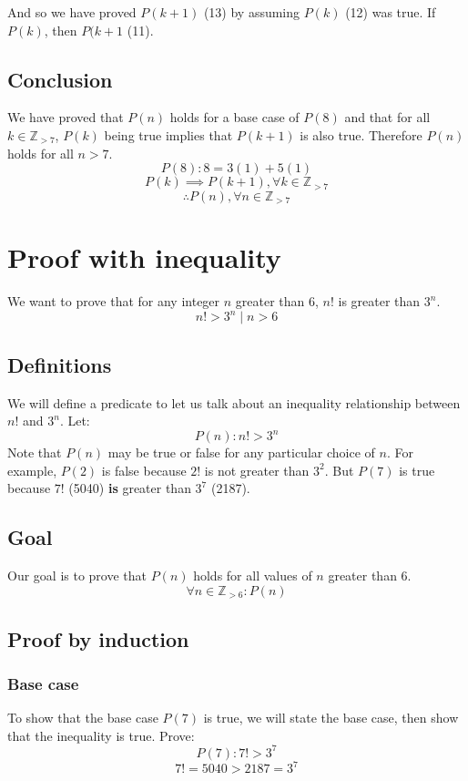 \documentclass{article}
\begin{document}
And so we have proved $P(k + 1)$ (13) by assuming $P(k)$ (12) was true. If $P(k)$, then $P(k + 1$ (11).

\subsection{Conclusion}
We have proved that $P(n)$ holds for a base case of $P(8)$ and that for all $k \in \mathbb Z_{> 7}$, $P(k)$ being true implies that $P(k + 1)$ is also true. Therefore $P(n)$ holds for all $n > 7$.
\[P(8): 8 = 3(1) + 5(1) \]
\[P(k) \implies P(k + 1), \forall k \in  \mathbb Z_{> 7}\]
\[ \therefore P(n), \forall n \in \mathbb Z_{> 7} \]


\section{Proof with inequality}
We want to prove that for any integer $n$ greater than 6, $n!$ is greater than $3^n$.
\[n! > 3^n \mid n > 6 \]
\subsection{Definitions}
We will define a predicate to let us talk about an inequality relationship between $n!$ and $3^n$. Let:
\begin{equation}
P(n): n! > 3^n
\end{equation}
Note that $P(n)$ may be true or false for any particular choice of $n$. For example, $P(2)$ is false because $2!$ is not greater than $3^2$. But $P(7)$ is true because $7!$ (5040) \textbf{is} greater than $3^7$ (2187).

\subsection{Goal}
Our goal is to prove that $P(n)$ holds for all values of $n$ greater than 6.
\begin{equation}
\forall n \in \mathbb Z_{> 6} : P(n)
\end{equation}

\subsection{Proof by induction}
\subsubsection{Base case}
To show that the base case $P(7)$ is true, we will state the base case, then show that the inequality is true. Prove:
\begin{equation}
P(7): 7! > 3^7
\end{equation}
\[ 7! = 5040 > 2187 = 3^7 \]
\end{document}
